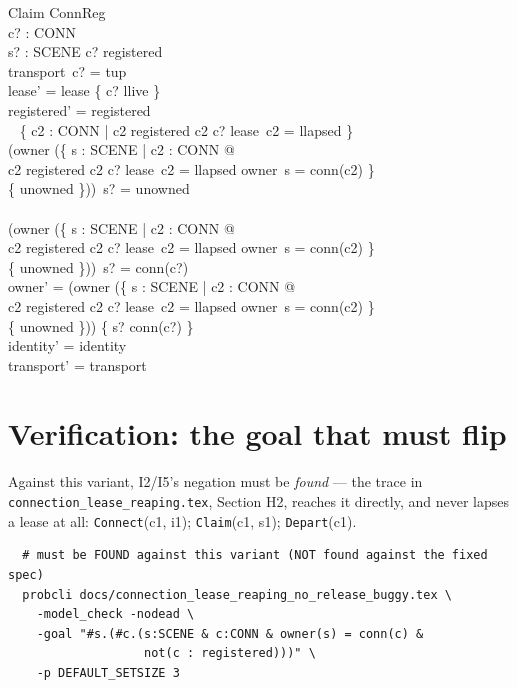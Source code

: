 \documentclass[a4paper,10pt,fleqn]{article}
\begin{document}
\begin{schema}{Claim}
  \Delta ConnReg \\
  c? : CONN \\
  s? : SCENE
\where
  c? \in registered \\
  transport~c? = tup \\
  lease' = lease \oplus \{ c? \mapsto llive \} \\
  registered' = registered \setminus \\
  \quad~ \{ c2 : CONN | c2 \in registered \land c2 \neq c? \land
    lease~c2 = llapsed \} \\
  (owner \oplus (\{ s : SCENE | \exists c2 : CONN @ \\
    \qquad c2 \in registered \land c2 \neq c? \land lease~c2 = llapsed
    \land owner~s = conn(c2) \} \\
    \qquad \cross \{ unowned \}))~s? = unowned \\
  \lor \\
  (owner \oplus (\{ s : SCENE | \exists c2 : CONN @ \\
    \qquad c2 \in registered \land c2 \neq c? \land lease~c2 = llapsed
    \land owner~s = conn(c2) \} \\
    \qquad \cross \{ unowned \}))~s? = conn(c?) \\
  owner' = (owner \oplus (\{ s : SCENE | \exists c2 : CONN @ \\
    \qquad c2 \in registered \land c2 \neq c? \land lease~c2 = llapsed
    \land owner~s = conn(c2) \} \\
    \qquad \cross \{ unowned \})) \oplus \{ s? \mapsto conn(c?) \} \\
  identity' = identity \\
  transport' = transport
\end{schema}

\section{Verification: the goal that must flip}

Against this variant, I2/I5's negation must be \emph{found} --- the trace
in \texttt{connection\_lease\_reaping.tex}, Section H2, reaches it
directly, and never lapses a lease at all:
\texttt{Connect}(c1, i1); \texttt{Claim}(c1, s1); \texttt{Depart}(c1).

\begin{verbatim}
  # must be FOUND against this variant (NOT found against the fixed spec)
  probcli docs/connection_lease_reaping_no_release_buggy.tex \
    -model_check -nodead \
    -goal "#s.(#c.(s:SCENE & c:CONN & owner(s) = conn(c) &
                   not(c : registered)))" \
    -p DEFAULT_SETSIZE 3
\end{verbatim}
\end{document}
